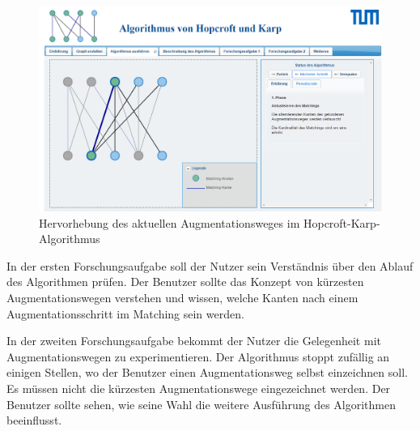 \begin{figure}[h!]
	\centering
	\includegraphics[width=\textwidth]{figures/hopcroft_karp_augmentation}
	\caption[Augmentationsweg]{Hervorhebung des aktuellen Augmentationsweges im Hopcroft-Karp-Algorithmus}\label{fig:hopcroft_karp_augmentation}
\end{figure}

In der ersten Forschungsaufgabe soll der Nutzer sein Verständnis über den Ablauf des Algorithmen prüfen. Der Benutzer sollte das Konzept von kürzesten Augmentationswegen verstehen und wissen, welche Kanten nach einem Augmentationsschritt im Matching sein werden.

In der zweiten Forschungsaufgabe bekommt der Nutzer die Gelegenheit mit Augmentationswegen zu experimentieren. Der Algorithmus stoppt zufällig an einigen Stellen, wo der Benutzer einen Augmentationsweg selbst einzeichnen soll. Es müssen nicht die kürzesten Augmentationswege eingezeichnet werden. Der Benutzer sollte sehen, wie seine Wahl die weitere Ausführung des Algorithmen beeinflusst.

